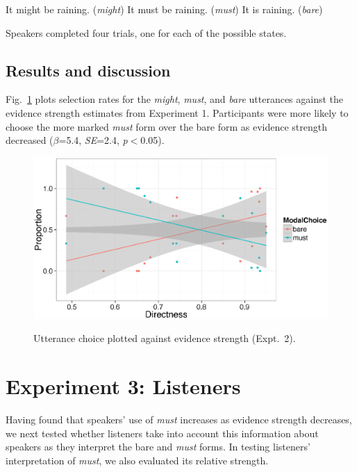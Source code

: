 \documentclass[10pt,letterpaper]{article}
\begin{document}
\begin{exe}
	\ex\label{rain} \begin{xlist}
		\ex It might be raining. \hfill (\emph{might})
		\ex It must be raining. \hfill (\emph{must})
		\ex It is raining. \hfill (\emph{bare})
		\end{xlist}
		\end{exe}
		
\noindent Speakers completed four trials, one for each of the possible states.		

\subsection{Results and discussion}

Fig.~\ref{expt2} plots selection rates for the \emph{might}, \emph{must}, and \emph{bare} utterances against the evidence strength estimates from Experiment 1. Participants were more likely to choose the more marked \emph{must} form over the bare form as evidence strength decreased ($\beta$=5.4, \emph{SE}=2.4, \emph{p}$<$0.05). 

\begin{figure}
\centering
{\includegraphics[width=\linewidth]{expt2.eps}}
\caption{Utterance choice plotted against evidence strength (Expt.~2).}
\label{expt2}
\end{figure}


\section{Experiment 3: Listeners}

Having found that speakers' use of \emph{must} increases as evidence strength decreases, we next tested whether listeners take into account this information about speakers as they interpret the bare and \emph{must} forms. In testing listeners' interpretation of \emph{must}, we also evaluated its relative strength.
\end{document}
